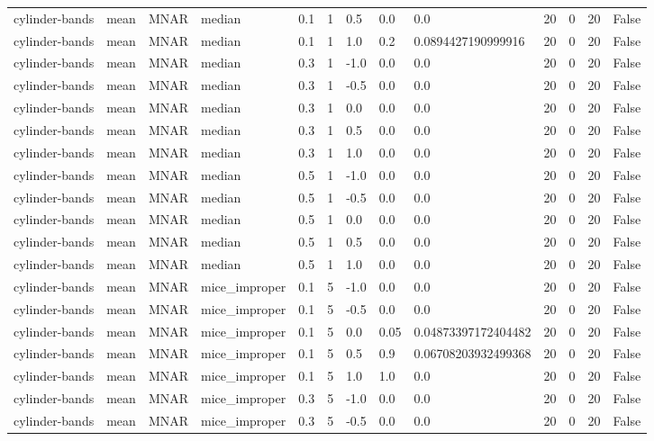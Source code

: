 \begin{tabular}{lllllllllllll}
cylinder-bands & mean & MNAR & median & 0.1 & 1 & 0.5 & 0.0 & 0.0 & 20 & 0 & 20 & False \\
cylinder-bands & mean & MNAR & median & 0.1 & 1 & 1.0 & 0.2 & 0.0894427190999916 & 20 & 0 & 20 & False \\
cylinder-bands & mean & MNAR & median & 0.3 & 1 & -1.0 & 0.0 & 0.0 & 20 & 0 & 20 & False \\
cylinder-bands & mean & MNAR & median & 0.3 & 1 & -0.5 & 0.0 & 0.0 & 20 & 0 & 20 & False \\
cylinder-bands & mean & MNAR & median & 0.3 & 1 & 0.0 & 0.0 & 0.0 & 20 & 0 & 20 & False \\
cylinder-bands & mean & MNAR & median & 0.3 & 1 & 0.5 & 0.0 & 0.0 & 20 & 0 & 20 & False \\
cylinder-bands & mean & MNAR & median & 0.3 & 1 & 1.0 & 0.0 & 0.0 & 20 & 0 & 20 & False \\
cylinder-bands & mean & MNAR & median & 0.5 & 1 & -1.0 & 0.0 & 0.0 & 20 & 0 & 20 & False \\
cylinder-bands & mean & MNAR & median & 0.5 & 1 & -0.5 & 0.0 & 0.0 & 20 & 0 & 20 & False \\
cylinder-bands & mean & MNAR & median & 0.5 & 1 & 0.0 & 0.0 & 0.0 & 20 & 0 & 20 & False \\
cylinder-bands & mean & MNAR & median & 0.5 & 1 & 0.5 & 0.0 & 0.0 & 20 & 0 & 20 & False \\
cylinder-bands & mean & MNAR & median & 0.5 & 1 & 1.0 & 0.0 & 0.0 & 20 & 0 & 20 & False \\
cylinder-bands & mean & MNAR & mice\_improper & 0.1 & 5 & -1.0 & 0.0 & 0.0 & 20 & 0 & 20 & False \\
cylinder-bands & mean & MNAR & mice\_improper & 0.1 & 5 & -0.5 & 0.0 & 0.0 & 20 & 0 & 20 & False \\
cylinder-bands & mean & MNAR & mice\_improper & 0.1 & 5 & 0.0 & 0.05 & 0.04873397172404482 & 20 & 0 & 20 & False \\
cylinder-bands & mean & MNAR & mice\_improper & 0.1 & 5 & 0.5 & 0.9 & 0.06708203932499368 & 20 & 0 & 20 & False \\
cylinder-bands & mean & MNAR & mice\_improper & 0.1 & 5 & 1.0 & 1.0 & 0.0 & 20 & 0 & 20 & False \\
cylinder-bands & mean & MNAR & mice\_improper & 0.3 & 5 & -1.0 & 0.0 & 0.0 & 20 & 0 & 20 & False \\
cylinder-bands & mean & MNAR & mice\_improper & 0.3 & 5 & -0.5 & 0.0 & 0.0 & 20 & 0 & 20 & False \\

\end{tabular}
